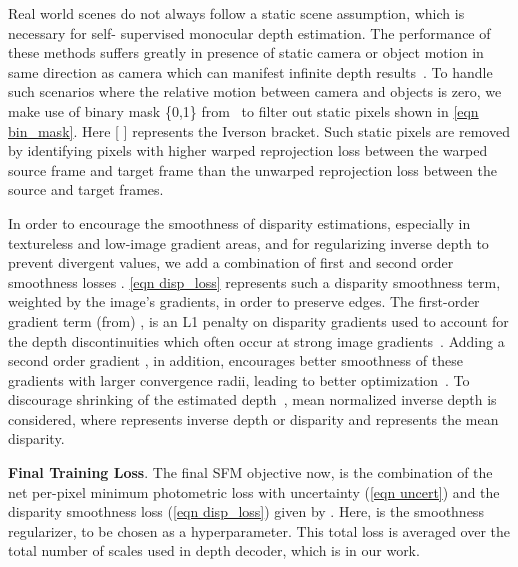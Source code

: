 \documentclass{bmvc2k}
\begin{document}
Real world scenes do not always follow a static scene assumption, which is necessary for self- supervised monocular depth estimation. The performance of these methods suffers greatly in presence of static camera or object motion in same direction as camera which can manifest infinite depth results~\cite{godard2019digging}. To handle such scenarios where the relative motion between camera and objects is zero, we make use of binary mask  \{0,1\} from~\cite{godard2019digging} to filter out static pixels shown in \autoref{eqn bin_mask}. Here [ ] represents the Iverson bracket. Such static pixels are removed by identifying pixels with higher warped reprojection loss between the warped source frame  and target frame  than the unwarped reprojection loss between the source and target frames.




In order to encourage the smoothness of disparity estimations, especially in textureless and low-image gradient areas, and for regularizing inverse depth to prevent divergent values, we add a combination of first and second order smoothness losses . \autoref{eqn disp_loss} represents such a disparity smoothness term, weighted by the image's gradients, in order to preserve edges. The first-order gradient term (from) , is an L1 penalty on disparity gradients used to account for the depth discontinuities which often occur at strong image gradients~\cite{heise2013pm}. Adding a second order gradient , in addition, encourages better smoothness of these gradients with larger convergence radii, leading to better optimization~\cite{shu2020feature}. To discourage shrinking of the estimated depth~\cite{godard2019digging}, mean normalized inverse depth  is considered, where  represents inverse depth or disparity and  represents the mean disparity.




\textbf{Final Training Loss}. The final SFM objective now, is the combination of the net per-pixel minimum photometric loss with uncertainty (\autoref{eqn uncert}) and the disparity smoothness loss (\autoref{eqn disp_loss}) given by . Here,  is the smoothness regularizer, to be chosen as a hyperparameter. This total loss  is averaged over the total number of scales used in depth decoder, which is  in our work.
\end{document}
